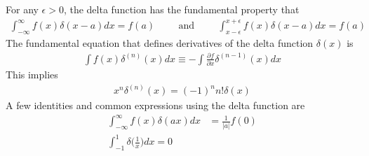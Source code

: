 For any $\epsilon > 0$, the delta function has the fundamental property that 
\begin{align}
	\int_{-\infty}^{\infty}f(x)\delta(x-a)dx = f(a) \hspace{1cm}\textrm{and}\hspace{1cm}\int_{x-\epsilon}^{x+\epsilon}f(x)\delta(x-a)dx = f(a)
\end{align}
The fundamental equation that defines derivatives of the delta function $\delta(x)$ is
\begin{align}
	\int f(x)\delta^{(n)}(x)dx \equiv -\int \frac{\partial f}{\partial x}\delta^{(n-1)}(x)dx
\end{align} 
This implies 
\begin{align}
	x^n\delta^{(n)}(x)=(-1)^nn!\delta(x)
\end{align}
A few identities and common expressions using the delta function are
\begin{align}
	\int_{-\infty}^{\infty}f(x)\delta(ax)dx &= \frac{1}{|a|}f(0) \\
	\int_{-1}^{1}\delta\bigg(\frac{1}{x}\bigg)dx = 0
\end{align}









\newpage



